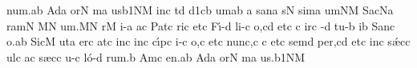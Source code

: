 \sgn nu{m.}\punctum a\augmentum b\egn
\spatium
\divisiofinalis
\spatium
\sgn {}Ad\punctum a\egn
\sgn {}or\punctum N\egn
{}m\punctum a\egn
\sgn {}u{s}\episem b1\clivis NM\egn
\spatium
\sgn {}in\punctum c\egn
\spatium
\sgn {}{\ae}t\punctum d\egn
{}\episem d1\clivis cb\egn
\sgn {}um\punctum a\augmentum b\egn
\spatium
\divisiominima
\spatium
\custos a
\lineaproxima
\sgn san\punctum a\egn
{}s\punctum N\egn
\sgn sim\punctum a\egn
\sgn {}um\clivis NM\egn
\spatium
\sgn Sac\pes Na\egn
\sgn ram\punctum N\egn
{}\punctum M\augmentum N\egn
\sgn {}u{m.}\punctum M\augmentum N\egn
\spatium
\divisiofinalis
\spatium
{}r\punctum M\egn
\sgn {}i-\punctum a\egn
\sgn {}a{}\punctum c\egn
\spatium
\sgn Pat\punctum c\egn
\sgn ri{}\punctum c\egn
\spatium
\sgn {}et\punctum c\egn
\spatium
\sgn F{\'\i}-\punctum d\egn
\sgn li-\punctum c\egn
\sgn {}o,\punctum c\augmentum d\egn
\spatium
\divisiomaior
\spatium
\sgn { }et\punctum c\egn
\spatium
\custos c
\lineaproxima
{}ir\punctum c\egn
\sgn {}{\'\i}-\punctum d\egn
\sgn tu-\punctum b\egn
\sgn {}i{}\punctum b\egn
\spatium
\sgn S{a}n\punctum c\egn
{}o.\punctum a\augmentum b\egn
\spatium
\divisiofinalis
\spatium
\sgn Si{c}\punctum M\egn
\sgn {}ut\punctum a\egn
\spatium
\sgn {}er\engl{}\punctum c\egn
\sgn {}at\punctum c\egn
\spatium
\sgn {}in\punctum c\egn
\spatium
{}in\punctum c\egn
\sgn c{\'\i}p\punctum c\egn
\sgn {}i-\punctum c\egn
\sgn {}o{,}\punctum c\egn
\spatium
\sgn { }et\punctum c\egn
\spatium
\sgn nu{nc,}\punctum c\egn
\spatium
\custos c
\lineaproxima
\sgn {}et\punctum c\egn
\spatium
\sgn sem\punctum d\egn
\sgn pe{r,}\punctum c\augmentum d\egn
\spatium
\divisiomaior
\spatium
\sgn { }et\punctum c\egn
\spatium
\sgn {}in\punctum c\egn
\spatium
\sgn s{\'\ae}c\punctum c\egn
\sgn {}ul\punctum c\egn
\sgn {}a{}\punctum c\egn
\spatium
\sgn s{\ae}c\punctum c\egn
\sgn {}u-\punctum c\egn
\sgn l{\'o}-\punctum d\egn
\sgn ru{m.}\punctum b\egn
\spatium
\sgn {}Am\punctum c\egn
\sgn {}e{n.}\punctum a\augmentum b\egn
\spatium
\divisiofinalis
\spatium
\sgn {}Ad\punctum a\egn
\sgn {}or\punctum N\egn
{}m\punctum a\egn
\sgn {}u{s.}\episem b1\clivis NM\egn
\spatium
\Finisgregoriana

